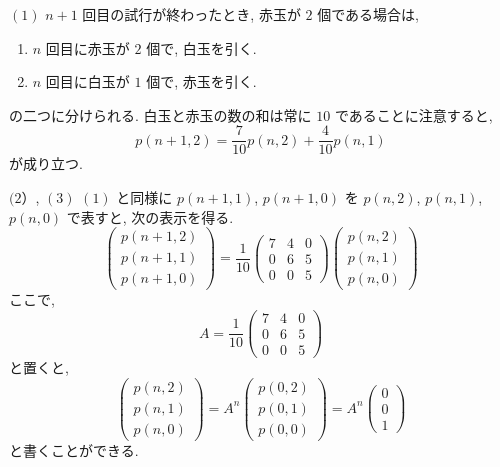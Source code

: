 \documentclass[main]{subfiles}
\begin{document}
\begin{pf}
$(1)$ $n+1$ 回目の試行が終わったとき, 赤玉が $2$ 個である場合は,
\begin{enumerate}
\item $n$ 回目に赤玉が $2$ 個で, 白玉を引く.
\item $n$ 回目に白玉が $1$ 個で, 赤玉を引く.
\end{enumerate}
の二つに分けられる. 
白玉と赤玉の数の和は常に $10$ であることに注意すると, 
\begin{equation*}
p(n+1, 2) = \frac{7}{10}p(n,2) + \frac{4}{10}p(n,1)
\end{equation*}
が成り立つ.

$(2）$, $(3)$ 
$(1)$ と同様に $p(n+1,1)$, $p(n+1,0)$ を $p(n,2)$, $p(n,1)$, $p(n,0)$ で表すと, 
次の表示を得る.
\begin{equation*}
\begin{pmatrix}
p(n+1,2) \\
p(n+1,1) \\
p(n+1,0)
\end{pmatrix} 
= \frac{1}{10}
\begin{pmatrix}
7 & 4 & 0 \\
0 & 6 & 5 \\
0 & 0 & 5
\end{pmatrix}
\begin{pmatrix}
p(n,2) \\
p(n,1) \\
p(n,0)
\end{pmatrix}
\end{equation*}
ここで, 
\begin{equation*}
A =  \frac{1}{10}
\begin{pmatrix}
7 & 4 & 0 \\
0 & 6 & 5 \\
0 & 0 & 5
\end{pmatrix}
\end{equation*}
と置くと, 
\begin{equation*}
\begin{pmatrix}
p(n,2) \\
p(n,1) \\
p(n,0)
\end{pmatrix} 
= A^n
\begin{pmatrix}
p(0,2) \\
p(0,1) \\
p(0,0)
\end{pmatrix} 
= A^n
\begin{pmatrix}
0 \\
0\\
1
\end{pmatrix} 
\end{equation*}
と書くことができる.


\end{pf}
\end{document}
